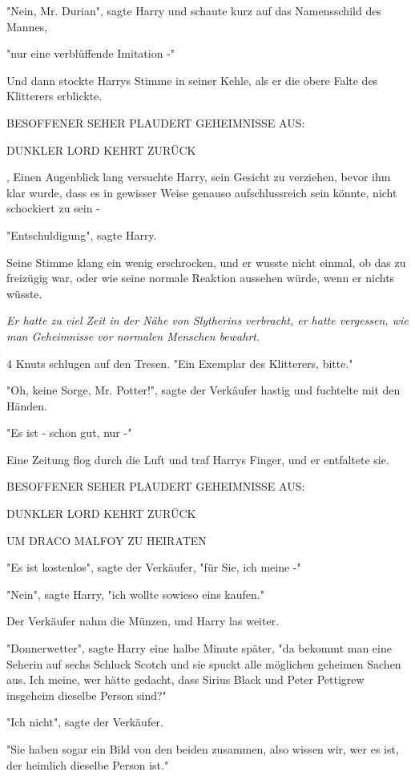 {"Nein, Mr. Durian", sagte Harry und schaute kurz auf das Namensschild des Mannes,

"nur eine verblüffende Imitation -"

Und dann stockte Harrys Stimme in seiner Kehle, als er die obere Falte des Klitterers erblickte.

BESOFFENER SEHER PLAUDERT GEHEIMNISSE AUS:

DUNKLER LORD KEHRT ZURÜCK

, Einen Augenblick lang versuchte Harry, sein Gesicht zu verziehen, bevor ihm klar wurde, dass es in gewisser Weise genauso aufschlussreich sein könnte, nicht schockiert zu sein -

"Entschuldigung", sagte Harry.

Seine Stimme klang ein wenig erschrocken, und er wusste nicht einmal, ob das zu freizügig war, oder wie seine normale Reaktion aussehen würde, wenn er nichts wüsste.

\emph{Er hatte zu viel Zeit in der Nähe von Slytherins verbracht, er hatte vergessen, wie man Geheimnisse vor normalen Menschen bewahrt.}

4 Knuts schlugen auf den Tresen. "Ein Exemplar des Klitterers, bitte."

"Oh, keine Sorge, Mr. Potter!", sagte der Verkäufer hastig und fuchtelte mit den Händen.

"Es ist - schon gut, nur -"

Eine Zeitung flog durch die Luft und traf Harrys Finger, und er entfaltete sie.

BESOFFENER SEHER PLAUDERT GEHEIMNISSE AUS:

DUNKLER LORD KEHRT ZURÜCK

UM DRACO MALFOY ZU HEIRATEN

"Es ist kostenlos", sagte der Verkäufer, "für Sie, ich meine -"

"Nein", sagte Harry, "ich wollte sowieso eins kaufen."

Der Verkäufer nahm die Münzen, und Harry las weiter.

"Donnerwetter", sagte Harry eine halbe Minute später, "da bekommt man eine Seherin auf sechs Schluck Scotch und sie spuckt alle möglichen geheimen Sachen aus. Ich meine, wer hätte gedacht, dass Sirius Black und Peter Pettigrew insgeheim dieselbe Person sind?"

"Ich nicht", sagte der Verkäufer.

"Sie haben sogar ein Bild von den beiden zusammen, also wissen wir, wer es ist, der heimlich dieselbe Person ist."

}
